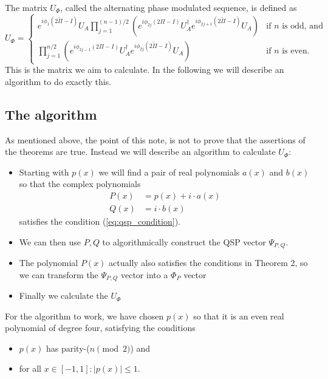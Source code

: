 \documentclass{article}
\begin{document}
\noindent The matrix $U_\Phi$, called the alternating phase modulated sequence, is defined as 
$$
U_{\Phi} = \begin{cases} e^{i\phi_1(2\tilde{\Pi}-I)}U_A \prod_{j=1}^{(n-1)/2} \left( e^{i\phi_{2j}(2\Pi-I)}U_A^\dagger e^{i\phi_{2j+1}(2\tilde{\Pi}-I)}U_A \right) & \text{if } n \text{ is odd, and} \\ \prod_{j=1}^{n/2} \left( e^{i\phi_{2j-1}(2\Pi-I)}U_A^\dagger e^{i\phi_{2j}(2\tilde{\Pi}-I)}U_A \right) & \text{if } n \text{ is even.} \end{cases}
$$
This is the matrix we aim to calculate. In the following we will describe an algorithm to do exactly this.

%
%

\subsection*{The algorithm}
As mentioned above, the point of this note, is not to prove that the assertions of the theorems are true. Instead we will describe an algorithm to calculate $U_{\Phi}$:

\begin{itemize}
    \item Starting with $p(x)$ we will find a pair of real polynomials $a(x)$ and $b(x)$ so that the complex polynomials
\begin{align*}
 P(x) & = p(x) + i \cdot a(x) \\
 Q(x) & = i \cdot b(x)
 \end{align*}
 satisfies the condition (\ref{eq:qsp_condition}).
    \item We can then use $P,Q$ to algorithmically construct the QSP vector $\Psi_{P,Q}$.
    \item The polynomial $P(x)$ actually also satisfies the conditions in Theorem 2, so we can transform the $\Psi_{P,Q}$ vector into a $\Phi_P$ vector
    \item Finally we calculate the $U_{\Phi}$
\end{itemize}

\noindent For the algorithm to work, we have chosen $p(x)$ so that it is an even real polynomial of degree four, satisfying the conditions
\begin{itemize}
    \item $p(x)$ has parity-($n \pmod 2$) and
    \item for all $x \in [-1, 1]: |p(x)| \leq 1$.
\end{itemize}
\end{document}
